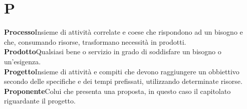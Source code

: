 \newpage
\section{P}\label{l:P}

\textbf{Processo}\newline Insieme di attività correlate e coese che rispondono ad un bisogno e che, consumando risorse, trasformano necessità in prodotti.\\
\newline
\textbf{Prodotto}\newline Qualsiasi bene o servizio in grado di soddisfare un bisogno o un'esigenza.\\
\newline
\textbf{Progetto}\newline Insieme di attività e compiti che devono raggiungere un obbiettivo secondo delle specifiche e dei tempi prefissati, utilizzando determinate risorse.\\
\newline
\textbf{Proponente}\newline Colui che presenta una proposta, in questo caso il capitolato riguardante il progetto.
